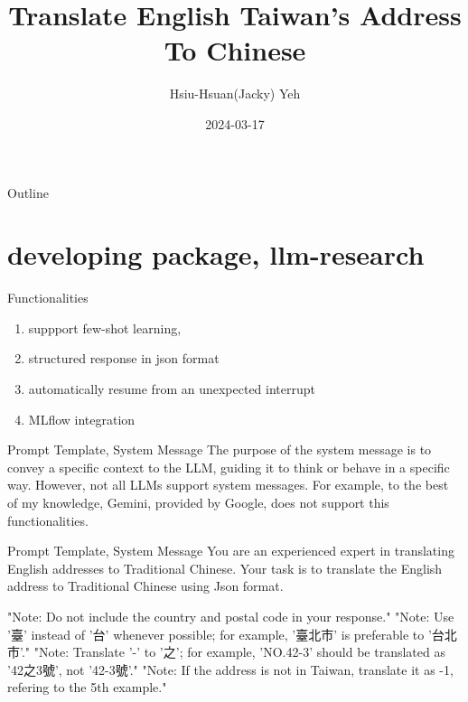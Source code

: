 \documentclass[11.5pt]{beamer}
\title{\huge{Translate English Taiwan's Address To Chinese}}
\author{Hsiu-Hsuan(Jacky) Yeh}
\date{2024-03-17}
\begin{document}
\maketitle


\begin{frame}{Outline}
\tableofcontents
\end{frame}


\section{developing package, llm-research}
\begin{frame}{Functionalities}

\begin{enumerate}
    \item suppport few-shot learning, \cite{Brown2020}
    \item structured response in json format
    \item automatically resume from an unexpected interrupt
    \item MLflow integration
\end{enumerate}

\end{frame}


\begin{frame}{Prompt Template, System Message}
The purpose of the system message is to convey a specific context to the LLM,
guiding it to think or behave in a specific way. However, not all LLMs support
system messages. For example, to the best of my knowledge, Gemini, provided by
Google, does not support this functionalities.
\end{frame}


\begin{frame}{Prompt Template, System Message}
You are an experienced expert in translating English addresses to Traditional Chinese.
Your task is to translate the English address to Traditional Chinese using Json format. \newline

"Note: Do not include the country and postal code in your response." \newline
"Note: Use '臺' instead of '台' whenever possible; for example, '臺北市' is preferable to '台北市'." \newline
"Note: Translate '-' to '之'; for example, 'NO.42-3' should be translated as '42之3號', not '42-3號'." \newline
"Note: If the address is not in Taiwan, translate it as -1, refering to the 5th example."
\end{frame}
\end{document}
